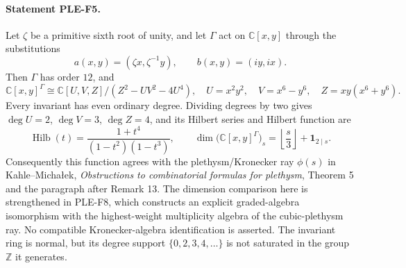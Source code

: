 \documentclass[11pt,a4paper]{article}
\begin{document}
\paragraph{Statement PLE-F5.}
Let $\zeta$ be a primitive sixth root of unity, and let $\Gamma$ act on
$\mathbb C[x,y]$ through the substitutions
\[
 a(x,y)=(\zeta x,\zeta^{-1}y),\qquad b(x,y)=(iy,ix).
\]
Then $\Gamma$ has order $12$, and
\[
 \mathbb C[x,y]^\Gamma\cong
 \mathbb C[U,V,Z]/(Z^2-UV^2-4U^4),
 \quad U=x^2y^2,\quad V=x^6-y^6,\quad Z=xy(x^6+y^6).
 \tag{PLE-F5a}
\]
Every invariant has even ordinary degree. Dividing degrees by two gives
$\deg U=2$, $\deg V=3$, $\deg Z=4$, and its Hilbert series and Hilbert
function are
\[
 \operatorname{Hilb}(t)=\frac{1+t^4}{(1-t^2)(1-t^3)},\qquad
 \dim\bigl(\mathbb C[x,y]^\Gamma\bigr)_s
      =\left\lfloor\frac{s}{3}\right\rfloor+\mathbf1_{2\mid s}.
 \tag{PLE-F5b}
\]
Consequently this function agrees with the plethysm/Kronecker ray
$\phi(s)$ in Kahle--Micha\l ek, \emph{Obstructions to combinatorial formulas
for plethysm}, Theorem 5 and the paragraph after Remark 13.
The dimension comparison here is strengthened in PLE-F8, which
constructs an explicit graded-algebra isomorphism with the
highest-weight multiplicity algebra of the cubic-plethysm ray.
No compatible Kronecker-algebra identification is asserted.
The invariant ring is normal, but its degree support
$\{0,2,3,4,\ldots\}$ is not saturated in the group $\mathbb Z$ it generates.
\end{document}
